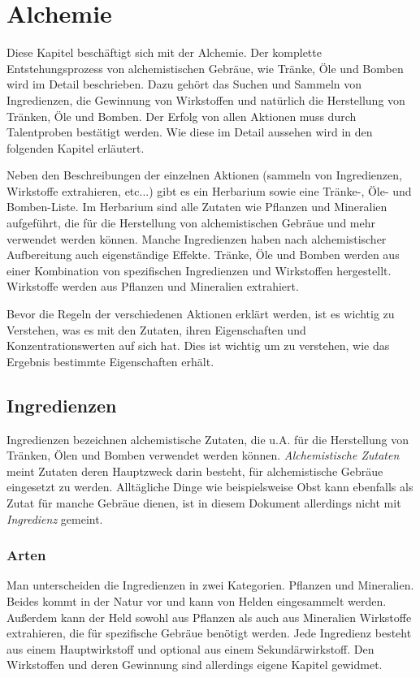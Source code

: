 {\let\clearpage\relax\chapter{Alchemie}}
Diese Kapitel beschäftigt sich mit der Alchemie. Der komplette Entstehungsprozess von alchemistischen Gebräue, wie Tränke, Öle und Bomben wird im Detail beschrieben. Dazu gehört das Suchen und Sammeln von Ingredienzen, die Gewinnung von Wirkstoffen und natürlich die Herstellung von Tränken, Öle und Bomben. Der Erfolg von allen Aktionen muss durch Talentproben bestätigt werden. Wie diese im Detail aussehen wird in den folgenden Kapitel erläutert. 

Neben den Beschreibungen der einzelnen Aktionen (sammeln von Ingredienzen, Wirkstoffe extrahieren, etc...) gibt es ein Herbarium sowie eine Tränke-, Öle- und Bomben-Liste. Im Herbarium sind alle Zutaten wie Pflanzen und Mineralien aufgeführt, die für die Herstellung von alchemistischen Gebräue und mehr verwendet werden können. Manche Ingredienzen haben nach alchemistischer Aufbereitung auch eigenständige Effekte. Tränke, Öle und Bomben werden aus einer Kombination von spezifischen Ingredienzen und Wirkstoffen hergestellt. Wirkstoffe werden aus Pflanzen und Mineralien extrahiert. 

Bevor die Regeln der verschiedenen Aktionen erklärt werden, ist es wichtig zu Verstehen, was es mit den Zutaten, ihren Eigenschaften und Konzentrationswerten auf sich hat. Dies ist wichtig um zu verstehen, wie das Ergebnis bestimmte Eigenschaften erhält.

\section{Ingredienzen}
Ingredienzen bezeichnen alchemistische Zutaten, die u.A. für die Herstellung von Tränken, Ölen und Bomben verwendet werden können. \textit{Alchemistische Zutaten} meint Zutaten deren Hauptzweck darin besteht, für alchemistische Gebräue eingesetzt zu werden. Alltägliche Dinge wie beispielsweise Obst kann ebenfalls als Zutat für manche Gebräue dienen, ist in diesem Dokument allerdings nicht mit \textit{Ingredienz} gemeint.

\subsection{Arten}
Man unterscheiden die Ingredienzen in zwei Kategorien. Pflanzen und Mineralien. Beides kommt in der Natur vor und kann von Helden eingesammelt werden. Außerdem kann der Held sowohl aus Pflanzen als auch aus Mineralien Wirkstoffe extrahieren, die für spezifische Gebräue benötigt werden. Jede Ingredienz besteht aus einem Hauptwirkstoff und optional aus einem Sekundärwirkstoff. Den Wirkstoffen und deren Gewinnung sind allerdings eigene Kapitel gewidmet.

